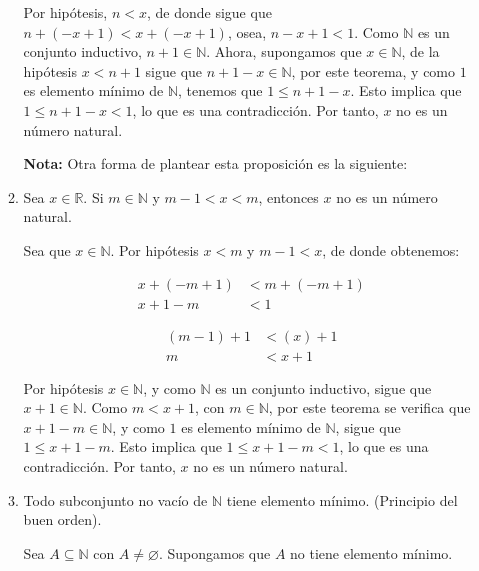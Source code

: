 \documentclass[11pt]{article}
\newcommand{\N}{\mathbb{N}}
\newcommand{\R}{\mathbb{R}}
\let\emptyset\varnothing
\let\subset\subseteq
\begin{document}
\begin{enumerate}[label=\alph*)]
\begin{enumerate}[label=\roman*)]
  Por hipótesis, $n<x$, de donde sigue que $n+(-x+1)<x+(-x+1)$, osea, $n-x+1<1$. Como $\N$ es un conjunto inductivo, $n+1\in \N$. Ahora, supongamos que $x\in \N$, de la hipótesis $x<n+1$ sigue que $n+1-x\in \N$, por este teorema, y como $1$ es elemento mínimo de $\N$, tenemos que $1\leq n+1-x$. Esto implica que $1\leq n+1-x < 1$, lo que es una contradicción. Por tanto, $x$ no es un número natural.

  \textbf{Nota:} Otra forma de plantear esta proposición es la siguiente:

  \item Sea $x\in \R$. Si $m\in \N$ y $m-1<x<m$, entonces $x$ no es un número natural.
  
  Sea que $x\in \N$. Por hipótesis $x<m$ y $m-1<x$, de donde obtenemos:
  \begin{center}\vspace{-1em}
   \begin{minipage}[l]{.4\linewidth}
   \begin{align*}
    x +(-m+1) &< m +(-m+1)\\
    x+1-m &< 1
   \end{align*}
   \end{minipage}%
   \begin{minipage}[r]{.4\linewidth}
   \begin{align*}
    (m-1) +1 &< (x)+1\\
    m &< x+1
   \end{align*}
   \end{minipage}
  \end{center}
  Por hipótesis $x\in \N$, y como $\N$ es un conjunto inductivo, sigue que $x+1\in \N$. Como $m<x+1$, con $m\in \N$, por este teorema se verifica que $x+1-m \in \N$, y como $1$ es elemento mínimo de $\N$, sigue que $1\leq x+1-m$. Esto implica que $1\leq x+1-m<1$, lo que es una contradicción. Por tanto, $x$ no es un número natural.

  \item Todo subconjunto no vacío de $\N$ tiene elemento mínimo. (Principio del buen orden).
  
  Sea $A\subset \N$ con $A\neq \emptyset$. Supongamos que $A$ no tiene elemento mínimo.
  

\end{enumerate}
\end{enumerate}
\end{document}
